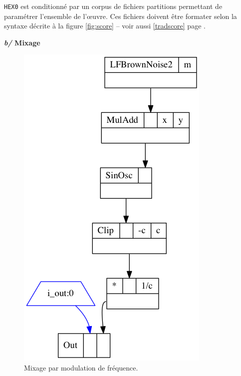   \texttt{HEX0} est conditionn\'e par un corpus  de fichiers partitions permettant de param\'etrer l'ensemble de l'\oe{}uvre. Ces fichiers doivent \^etre formater selon la syntaxe d\'ecrite \`a la figure \ref{fig:score} -- voir aussi \ref{tradscore} page \pageref{tradscore}.
  

\bigskip

  \textbf{\textit{b/ } Mixage }
  
  \smallskip
  
  \begin{figure}
\includegraphics[width=0.9\linewidth]{img/2328} 
\caption{Mixage par modulation de fr\'equence.}
\label{fig:mix}
\end{figure}


